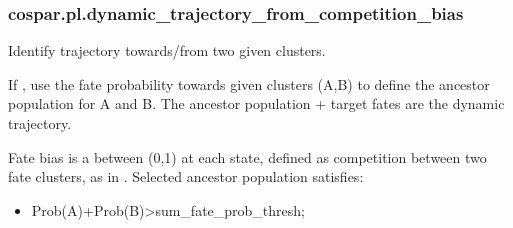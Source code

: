 \documentclass[letterpaper,10pt,english]{sphinxmanual}
\begin{document}
\subsubsection{cospar.pl.dynamic\_trajectory\_from\_competition\_bias}
\label{\detokenize{cospar.pl.dynamic_trajectory_from_competition_bias:cospar-pl-dynamic-trajectory-from-competition-bias}}\label{\detokenize{cospar.pl.dynamic_trajectory_from_competition_bias::doc}}

\begin{fulllineitems}
\label{\detokenize{cospar.pl.dynamic_trajectory_from_competition_bias:cospar.pl.dynamic_trajectory_from_competition_bias}}
Identify trajectory towards/from two given clusters.

If , use the fate probability towards given clusters (A,B)
to define the ancestor population for A and B. The ancestor population + target fates
are the dynamic trajectory.

Fate bias is a  between (0,1) at each state, defined as competition between
two fate clusters, as in {\hyperref[\detokenize{cospar.pl.fate_bias_from_binary_competition:cospar.pl.fate_bias_from_binary_competition}]{}}. Selected ancestor population satisfies:
\begin{itemize}
\item {} 
Prob(A)+Prob(B)\textgreater{}sum\_fate\_prob\_thresh;


\end{itemize}
\end{fulllineitems}
\end{document}
